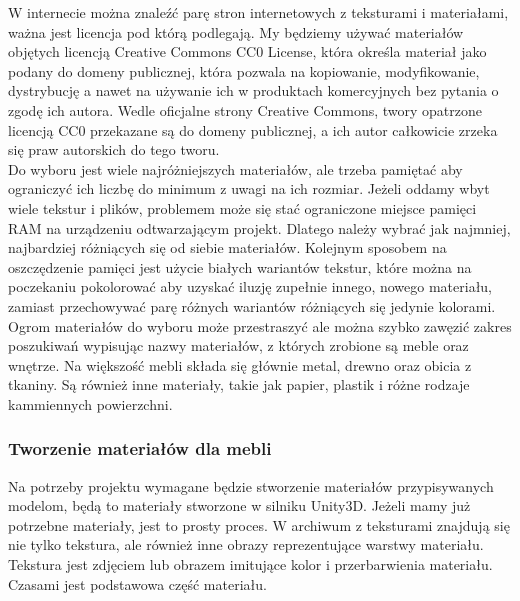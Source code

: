 \documentclass{article} %
\begin{document}
            W internecie można znaleźć parę stron internetowych z teksturami i materiałami, ważna jest licencja pod którą podlegają. My będziemy używać materiałów objętych licencją Creative Commons CC0 License, która określa materiał jako podany do domeny publicznej, która pozwala na kopiowanie, modyfikowanie, dystrybucję a nawet na używanie ich w produktach komercyjnych bez pytania o zgodę ich autora. Wedle oficjalne strony Creative Commons, twory opatrzone licencją CC0 przekazane są do domeny publicznej, a ich autor całkowicie zrzeka się praw autorskich do tego tworu. \cite{creative}
            \\
            
            Do wyboru jest wiele najróżniejszych materiałów, ale trzeba pamiętać aby ograniczyć ich liczbę do minimum z uwagi na ich rozmiar. Jeżeli oddamy wbyt wiele tekstur i plików, problemem może się stać ograniczone miejsce pamięci RAM na urządzeniu odtwarzającym projekt. Dlatego należy wybrać jak najmniej, najbardziej różniących się od siebie materiałów. Kolejnym sposobem na oszczędzenie pamięci jest użycie białych wariantów tekstur, które można na poczekaniu pokolorować aby uzyskać iluzję zupełnie innego, nowego materiału, zamiast przechowywać parę różnych wariantów różniących się jedynie kolorami. 
            \\
            
            Ogrom materiałów do wyboru może przestraszyć ale można szybko zawęzić zakres poszukiwań wypisując nazwy materiałów, z których zrobione są meble oraz wnętrze. Na większość mebli składa się głównie metal, drewno oraz obicia z tkaniny. Są również inne materiały, takie jak papier, plastik i różne rodzaje kammiennych powierzchni.
            \\
            
        \subsubsection{Tworzenie materiałów dla mebli}
            Na potrzeby projektu wymagane będzie stworzenie materiałów przypisywanych modelom, będą to materiały stworzone w silniku Unity3D. Jeżeli mamy już potrzebne materiały, jest to prosty proces. W archiwum z teksturami znajdują się nie tylko tekstura, ale również inne obrazy reprezentujące warstwy materiału. Tekstura jest zdjęciem lub obrazem imitujące kolor i przerbarwienia materiału. Czasami jest podstawowa część materiału.
            \\
            
\end{document}
